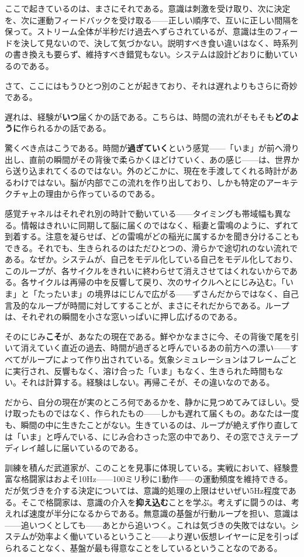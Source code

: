 \documentclass[11pt, twoside, openright]{book}
\begin{document}
ここで起きているのは、まさにそれである。意識は刺激を受け取り、次に決定を、次に運動フィードバックを受け取る------正しい順序で、互いに正しい間隔を保って。ストリーム全体が半秒だけ過去へずらされているが、意識は生のフィードを決して見ないので、決して気づかない。説明すべき食い違いはなく、時系列の書き換えも要らず、維持すべき錯覚もない。システムは設計どおりに動いているのである。

さて、ここにはもうひとつ別のことが起きており、それは遅れよりもさらに奇妙である。

遅れは、経験が\textbf{いつ}届くかの話である。こちらは、時間の流れがそもそも\textbf{どのように}作られるかの話である。

驚くべき点はこうである。時間が\textbf{過ぎていく}という感覚------「いま」が前へ滑り出し、直前の瞬間がその背後で柔らかくほどけていく、あの感じ------は、世界から送り込まれてくるのではない。外のどこかに、現在を手渡してくれる時計があるわけではない。脳が内部でこの流れを作り出しており、しかも特定のアーキテクチャ上の理由から作っているのである。

感覚チャネルはそれぞれ別の時計で動いている------タイミングも帯域幅も異なる。情報はきれいに同期して脳に届くのではなく、稲妻と雷鳴のように、ずれて到着する。注意を凝らせば、どの雷鳴がどの稲光に属するかを聞き分けることもできる。それでも、生きられるのはただひとつの、滑らかで途切れのない流れである。なぜか。システムが、自己をモデル化している自己をモデル化しており、このループが、各サイクルをきれいに終わらせて消えさせてはくれないからである。各サイクルは再帰の中を反響して戻り、次のサイクルへとにじみ込む。「いま」と「たったいま」の境界はにじんで広がる------ずさんだからではなく、自己言及的なループが時間に対してすることが、まさにそれだからである。ループは、それぞれの瞬間を小さな窓いっぱいに押し広げるのである。

そのにじみ\textbf{こそ}が、あなたの現在である。鮮やかなまさに今、その背後で尾を引いて消えていく直近の過去、時間が過ぎると呼んでいるあの前方への漂い------すべてがループによって作り出されている。気象シミュレーションはフレームごとに実行され、反響もなく、溶け合った「いま」もなく、生きられた時間もない。それは計算する。経験はしない。再帰こそが、その違いなのである。

だから、自分の現在が実のところ何であるかを、静かに見つめてみてほしい。受け取ったものではなく、作られたもの------しかも遅れて届くもの。あなたは一度も、瞬間の中に生きたことがない。生きているのは、ループが絶えず作り直しては「いま」と呼んでいる、にじみ合わさった窓の中であり、その窓でさえテープディレイ越しに届いているのである。

訓練を積んだ武道家が、このことを見事に体現している。実戦において、経験豊富な格闘家はおよそ10Hz------100ミリ秒に1動作------の運動頻度を維持できる。だが気づきを介する決定については、意識的処理の上限はせいぜい5Hz程度である。そこで格闘家は、意識の介入を\textbf{抑え込む}ことを学ぶ。考えずに闘うのは、考えれば速度が半分になるからである。無意識の基盤が行動ループを担い、意識は------追いつくとしても------あとから追いつく。これは気づきの失敗ではない。システムが効率よく働いているということ------より遅い仮想レイヤーに足を引っぱられることなく、基盤が最も得意なことをしているということなのである。
\end{document}
